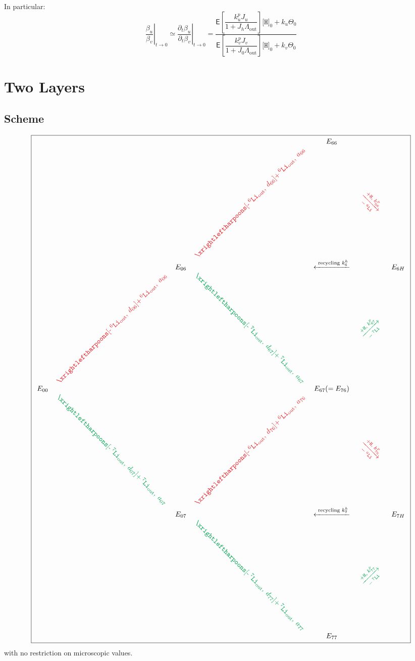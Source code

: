 \documentclass[aps,onecolumn,11pt]{revtex4}
\newcommand{\mychem}[1]{\mathtt{#1}}
\newcommand{\myconc}[1]{\big[#1\big]}
\newcommand{\spLi}[1]{{\!~^{#1}\mychem{Li}}}
\newcommand{\spproton}{\mychem{H}}
\newcommand{\proton}{\myconc{\spproton}}
\newcommand{\myout}[1]{{#1}_{\mathrm{out}}}
\newcommand{\spLiOut}[1]{\myout{\spLi{#1}}}
\newcommand{\myrotate}[2]{\rotatebox[origin=c]{#1}{#2}}
\newcommand{\LiAll}{\Lambda}
\newcommand{\LiAllOut}{\myout{\LiAll}}
\newcommand{\inpLi}[1]{\text{+}\spLiOut{#1}}
\newcommand{\outLi}[1]{\text{-}\spLiOut{#1}}
\newcommand{\mycolor}[2]{\ifthenelse{\equal{#1}{6}}{{\color{Red}#2}}{{\color{Green}#2}}}
\begin{document}
In particular:
\begin{equation}
\label{eq:level1}
	\left.\dfrac{\beta_u}{\beta_v}\right\vert_{t\to0} \simeq \left.\dfrac{\partial_t \beta_u}{\partial_t\beta_v}\right\vert_{t\to0}
	= \dfrac{\mathsf{E} \left[\dfrac{k^p_u J_u}{1+J_h \LiAllOut}\right] \proton_0 + k_u  \Theta_0
	}
	{
	\mathsf{E} \left[\dfrac{k^p_v J_v}{1+J_0 \LiAllOut}\right] \proton_0 + k_v  \Theta_0
	}
\end{equation}


\section{Two Layers}
\subsection{Scheme}
{
\Large
\begin{equation}
\boxed{
\begin{array}{ccccccc}
 & &        &                                                  & E_{66} & & \\
 & &        & \myrotate{45}{\mycolor{6}{$\xrightleftharpoons[\outLi{6},\;d_{66}]{\inpLi{6},\;a_{66}}$}} & &  \myrotate{-45}{\mycolor{6}{$\xrightarrow[-\spLi{6}]{+ \spproton, \; k^p_{66}}$}}& \\
 & & E_{06} &  & \xleftarrow{\text{ recycling } k^h_6 } & & E_{6H}\\
 &  \myrotate{45}{\mycolor{6}{$\xrightleftharpoons[\outLi{6},\;d_{06}]{\inpLi{6},\;a_{06}}$}} &   & \myrotate{-45}{\mycolor{7}{$\xrightleftharpoons[\outLi{7},\;d_{67}]{\inpLi{7},\;a_{67}}$}} & & \myrotate{45}{\mycolor{7}{$\xrightarrow[-\spLi{7}]{+ \spproton, \; k^p_{67}}$}}&\\
E_{00} & &  & & E_{67}(=E_{76}) & & \\ 
  & \myrotate{-45}{\mycolor{7}{$\xrightleftharpoons[\outLi{7},\;d_{07}]{\inpLi{7},\;a_{07}}$}} &  & \myrotate{45}{\mycolor{6}{$\xrightleftharpoons[\outLi{6},\;d_{76}]{\inpLi{6},\;a_{76}}$}} & & \myrotate{-45}{\mycolor{6}{$\xrightarrow[-\spLi{6}]{+ \spproton, \; k^p_{76}}$}} & \\
  & & E_{07} &   & \xleftarrow{\text{ recycling } k^h_7 } & & E_{7H}\\
  & &  & \myrotate{-45}{\mycolor{7}{$\xrightleftharpoons[\outLi{7},\;d_{77}]{\inpLi{7},\;a_{77}}$}} & & \myrotate{45}{\mycolor{7}{$\xrightarrow[-\spLi{7}]{+ \spproton, \; k^p_{77}}$}} &\\
  & &  &  & E_{77} & &\\

 \end{array}
 }
\end{equation}
}
with no restriction on microscopic values.
\end{document}
